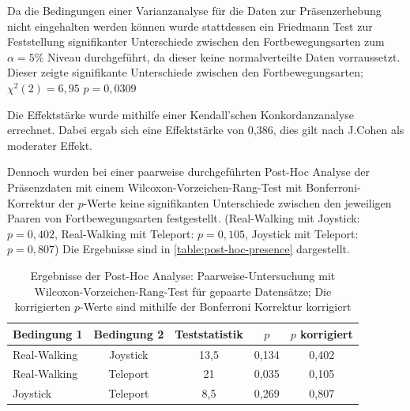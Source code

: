                     Da die Bedingungen einer Varianzanalyse für die Daten zur Präsenzerhebung nicht eingehalten werden können wurde stattdessen ein Friedmann Test zur Feststellung signifikanter Unterschiede zwischen den Fortbewegungsarten zum $\alpha = 5\%$ Niveau durchgeführt, da dieser keine normalverteilte Daten vorraussetzt.
                    Dieser zeigte signifikante Unterschiede zwischen den Fortbewegungsarten; $\chi^2(2) = 6,95$  $p = 0,0309$

                    Die Effektstärke wurde mithilfe einer  Kendall’schen Konkordanzanalyse errechnet. Dabei ergab sich eine Effektstärke von 0,386, dies gilt nach J.Cohen %
                    als moderater Effekt.


                    Dennoch wurden bei einer paarweise durchgeführten Post-Hoc Analyse der Präsenzdaten mit einem
                    Wilcoxon-Vorzeichen-Rang-Test mit Bonferroni-Korrektur der $p$-Werte keine signifikanten Unterschiede zwischen den jeweiligen Paaren von Fortbewegungsarten festgestellt. (Real-Walking mit Joystick: $p = 0,402$, Real-Walking mit Teleport: $p = 0,105$, Joystick mit Teleport: $p = 0,807$) Die Ergebnisse sind in \autoref{table:post-hoc-presence} dargestellt.

\begin{table}[!ht]
    \renewcommand\arraystretch{1.2}
    \centering
    \begin{tabular}{lcccc} \toprule
Bedingung 1& Bedingung 2& Teststatistik &  $p$  & $p$ korrigiert \\ \midrule
Real-Walking & Joystick & 13,5          & 0,134 & 0,402         \\
Real-Walking & Teleport & 21            & 0,035 & 0,105         \\
Joystick     & Teleport & 8,5           & 0,269 & 0,807 \\ \bottomrule
    \end{tabular}
    \caption{Ergebnisse der Post-Hoc Analyse: Paarweise-Untersuchung mit Wilcoxon-Vorzeichen-Rang-Test für gepaarte Datensätze; Die korrigierten $p$-Werte sind mithilfe der Bonferroni Korrektur korrigiert}\label{table:post-hoc-presence}
\end{table}

